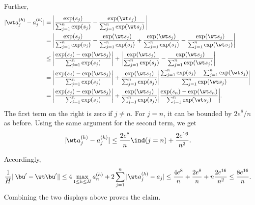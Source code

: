 \documentclass[aspectratio=169,10pt]{beamer}
\newcommand{\currentheading}{\ifx\insertsubsection\empty\insertsection\else\insertsubsection\fi}
\begin{document}
\begin{frame}{\currentheading}
\small
Further,
\begin{align*}
	|\wt a_j^{(h)} - a_j^{(h)}| & =  \biggl| \frac{\exp(s_j) }{\sum_{j = 1}^n \exp(s_j)} - \frac{\exp(\wt s_j) }{\sum_{j = 1}^{n} \exp(\wt s_j)} \biggr|                                                                                                                           \\
	                & =  \biggl| \frac{\exp(s_j) }{\sum_{j = 1}^n \exp(s_j)} - \frac{\exp(\wt s_j) }{\sum_{j = 1}^n \exp(s_j)} + \frac{\exp(\wt s_j) }{\sum_{j = 1}^n \exp(s_j)} - \frac{\exp(\wt s_j) }{\sum_{j = 1}^{n} \exp(\wt s_j)} \biggr|                       \\
	                & \le  \biggl| \frac{\exp(s_j) - \exp(\wt s_j) }{\sum_{j = 1}^n \exp(s_j)}  \biggr| + \biggl|  \frac{\exp(\wt s_j) }{\sum_{j = 1}^n \exp(s_j)} - \frac{\exp(\wt s_j) }{\sum_{j = 1}^{n} \exp(\wt s_j)} \biggr|                                     \\
	                & =  \biggl| \frac{\exp(s_j) - \exp(\wt s_j) }{\sum_{j = 1}^n \exp(s_j)}  \biggr| +  \frac{\exp(\wt s_j)}{\sum_{j = 1}^n \exp(s_j)} \biggl| \frac{\sum_{j = 1}^n \exp(s_j) - \sum_{j = 1}^n \exp(\wt s_j)}{\sum_{j = 1}^{n} \exp(\wt s_j)} \biggr| \\
	                & =  \biggl| \frac{\exp(s_j) - \exp(\wt s_j) }{\sum_{j = 1}^n \exp(s_j)}  \biggr| +  \frac{\exp(\wt s_j)}{\sum_{j = 1}^n \exp(s_j)} \biggl| \frac{\exp(s_n) -  \exp(\wt s_n)}{\sum_{j = 1}^{n} \exp(\wt s_j)} \biggr|.
\end{align*}
The first term on the right is zero if $j \neq n$. For $j = n$, it can be bounded by $2e^8 / n$ as before. Using the same argument for the second term, we get
\begin{align*}
	|\wt a_j^{(h)} - a_j^{(h)}| \le \frac{2e^8}{n} \ind(j = n) + \frac{2e^{16}}{n^2}.
\end{align*}
\end{frame}

\begin{frame}{\currentheading}
Accordingly,
\begin{align*}
	\frac 1 H \|\bu' - \wt \bu'\|
	\le  4 \max_{1 \le h \le H}  a_n^{(h)}   + 2 \sum_{j = 1}^{n} |\wt a_j^{(h)}-  a_{j}|
	\le  \frac{4e^8}{n} + \frac{2e^8}{n} + n \frac{2e^{16}}{n^2} \le \frac{8e^{16}}{n}.
\end{align*}
Combining the two displays above proves the claim.
\end{frame}
\end{document}
